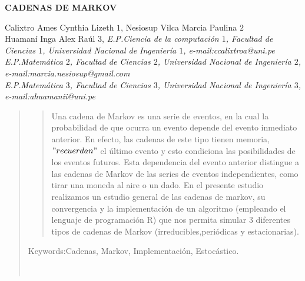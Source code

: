 \documentclass[10pt,a4paper]{article}
\theoremstyle{definition}
\theoremstyle{remark}
\begin{document}
\begin{center}
 {\Large \textbf{CADENAS DE MARKOV}}
\end{center}
\begin{center}
Calixtro Ames Cynthia Lizeth $1$, Nesiosup Vilca Marcia Paulina $2$\\
Huamaní Inga Alex Raúl $3$, \vskip12pt
{\it E.P.Ciencia de la computación $1$, Facultad de Ciencias $1$, Universidad Nacional 
de Ingeniería $1$, e-mail:ccalixtroa@uni.pe \\E.P.Matemática $2$, Facultad de Ciencias 
$2$, Universidad Nacional de Ingeniería $2$, e-mail:marcia.nesiosup@gmail.com \\ 
E.P.Matemática $3$, Facultad de Ciencias $3$, Universidad Nacional de Ingeniería $3$,  
\\e-mail:ahuamanii@uni.pe}
\end{center}
\begin{quotation}
{\small
\begin{abstract}
\noindent  Una cadena de Markov es una serie de eventos, en la cual la probabilidad de 
que ocurra un evento depende del evento inmediato anterior. En efecto, las cadenas de 
este tipo tienen memoria, $"recuerdan"$ el último evento y esto condiciona las 
posibilidades de los eventos futuros. Esta dependencia del evento anterior distingue a 
las cadenas de Markov de las series de eventos independientes, como tirar una moneda al 
aire o un dado. En el presente estudio realizamos un estudio general de las cadenas de 
markov, su convergencia y la implementación de un algoritmo (empleando el lenguaje de 
programación R) que nos permita simular 3 diferentes tipos de cadenas de Markov 
(irreducibles,periódicas y estacionarias).

\end{abstract}
\hspace*{0.5cm} Keywords:Cadenas, Markov, Implementación, Estocástico.  
}\\

\end{quotation}
\end{document}
